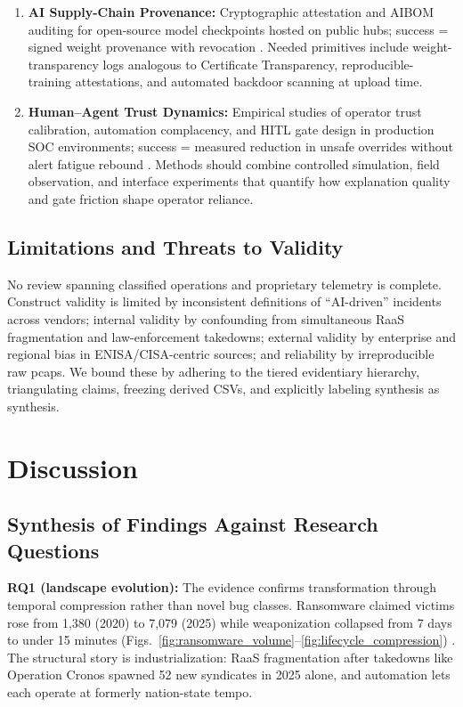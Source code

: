 \documentclass[conference,10pt,twocolumn,a4paper]{IEEEtran}
\begin{document}
\begin{enumerate}
    \item \textbf{AI Supply-Chain Provenance:} Cryptographic attestation and AIBOM auditing for open-source model checkpoints hosted on public hubs; success = signed weight provenance with revocation \cite{nist_csf_ai_2026, cisa_aa26_251a}. Needed primitives include weight-transparency logs analogous to Certificate Transparency, reproducible-training attestations, and automated backdoor scanning at upload time.
    \item \textbf{Human--Agent Trust Dynamics:} Empirical studies of operator trust calibration, automation complacency, and HITL gate design in production SOC environments; success = measured reduction in unsafe overrides without alert fatigue rebound \cite{nist_ir_8596_2025, cisa_agentic_ai_2026}. Methods should combine controlled simulation, field observation, and interface experiments that quantify how explanation quality and gate friction shape operator reliance.
\end{enumerate}

\subsection{Limitations and Threats to Validity}
No review spanning classified operations and proprietary telemetry is complete. Construct validity is limited by inconsistent definitions of ``AI-driven'' incidents across vendors; internal validity by confounding from simultaneous RaaS fragmentation and law-enforcement takedowns; external validity by enterprise and regional bias in ENISA/CISA-centric sources; and reliability by irreproducible raw pcaps. We bound these by adhering to the tiered evidentiary hierarchy, triangulating claims, freezing derived CSVs, and explicitly labeling synthesis as synthesis.

\section{Discussion}
\label{sec:discussion}
\subsection{Synthesis of Findings Against Research Questions}
\textbf{RQ1 (landscape evolution):} The evidence confirms transformation through temporal compression rather than novel bug classes. Ransomware claimed victims rose from 1,380 (2020) to 7,079 (2025) while weaponization collapsed from 7 days to under 15 minutes (Figs.~\ref{fig:ransomware_volume}--\ref{fig:lifecycle_compression}) \cite{enisa_frontier_2026, blackkite_ransomware_2025}. The structural story is industrialization: RaaS fragmentation after takedowns like Operation Cronos spawned 52 new syndicates in 2025 alone, and automation lets each operate at formerly nation-state tempo.
\end{document}
